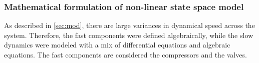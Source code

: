 
\newpage

\subsubsection{Mathematical formulation of non-linear state space model} \label{sec:non_lin_model}
As described in \cref{sec:mod}, there are large variances in dynamical speed across the system. Therefore, the fast components were defined algebraically, while the slow dynamics were modeled with a mix of differential equations and algebraic equations. The fast components are considered the compressors and the valves.

